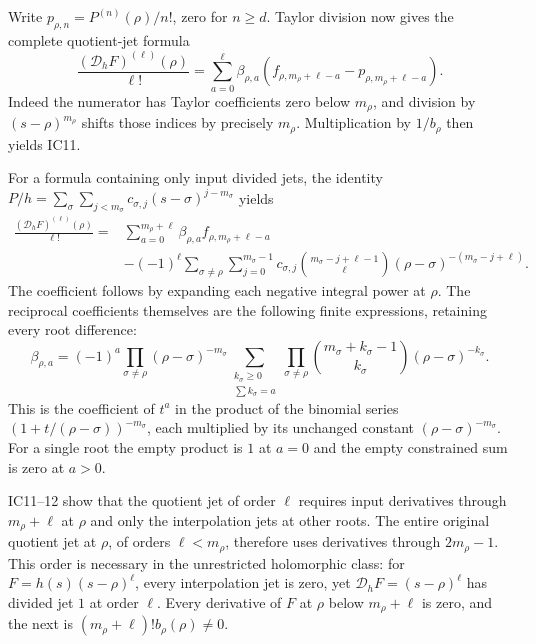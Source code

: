 \documentclass[11pt]{article}
\begin{document}
Write $p_{\rho,n}=P^{(n)}(\rho)/n!$, zero for $n\ge d$.
Taylor division now gives the complete quotient-jet formula
\begin{equation}\tag{IC11}
 \frac{(\mathcal D_hF)^{(\ell)}(\rho)}{\ell!}
 =\sum_{a=0}^{\ell}\beta_{\rho,a}
        (f_{\rho,m_\rho+\ell-a}-p_{\rho,m_\rho+\ell-a}).
\end{equation}
Indeed the numerator has Taylor coefficients zero below
$m_\rho$, and division by $(s-\rho)^{m_\rho}$ shifts those
indices by precisely $m_\rho$. Multiplication by $1/b_\rho$
then yields IC11.

For a formula containing only input divided jets, the identity
$P/h=\sum_\sigma\sum_{j<m_\sigma}c_{\sigma,j}
(s-\sigma)^{j-m_\sigma}$ yields
\begin{equation}\tag{IC12}
 \begin{split}
 \frac{(\mathcal D_hF)^{(\ell)}(\rho)}{\ell!}
 ={}&\sum_{a=0}^{m_\rho+\ell}\beta_{\rho,a}f_{\rho,m_\rho+\ell-a}\\
 &-(-1)^\ell\sum_{\sigma\ne\rho}\sum_{j=0}^{m_\sigma-1}
 c_{\sigma,j}\binom{m_\sigma-j+\ell-1}{\ell}
 (\rho-\sigma)^{-(m_\sigma-j+\ell)}.
 \end{split}
\end{equation}
The coefficient follows by expanding each negative integral
power at $\rho$. The reciprocal coefficients themselves are
the following finite expressions, retaining every root difference:
\begin{equation}\tag{IC13}
 \beta_{\rho,a}=(-1)^a\prod_{\sigma\ne\rho}(\rho-\sigma)^{-m_\sigma}
 \sum_{\substack{k_\sigma\ge0\\\sum k_\sigma=a}}
 \prod_{\sigma\ne\rho}\binom{m_\sigma+k_\sigma-1}{k_\sigma}
                    (\rho-\sigma)^{-k_\sigma}.
\end{equation}
This is the coefficient of $t^a$ in the product of the binomial
series $(1+t/(\rho-\sigma))^{-m_\sigma}$, each multiplied by
its unchanged constant $(\rho-\sigma)^{-m_\sigma}$.
For a single root the empty product is $1$ at $a=0$ and the
empty constrained sum is zero at $a>0$.

IC11--12 show that the quotient jet of order $\ell$ requires
input derivatives through $m_\rho+\ell$ at $\rho$ and only
the interpolation jets at other roots. The entire original quotient
jet at $\rho$, of orders $\ell<m_\rho$, therefore uses derivatives
through $2m_\rho-1$. This order is necessary in the unrestricted
holomorphic class: for $F=h(s)(s-\rho)^\ell$, every interpolation
jet is zero, yet $\mathcal D_hF=(s-\rho)^\ell$ has divided jet
$1$ at order $\ell$. Every derivative of $F$ at $\rho$ below
$m_\rho+\ell$ is zero, and the next is
$(m_\rho+\ell)!b_\rho(\rho)\ne0$.
\end{document}
